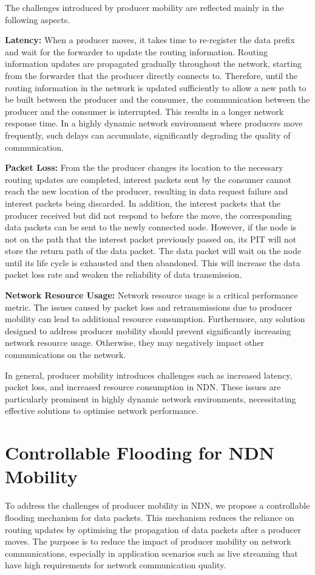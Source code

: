 \documentclass[conference]{IEEEtran}
\begin{document}
The challenges introduced by producer mobility are reflected mainly in the following aspects.

\textbf{Latency:} When a producer moves, it takes time to re-register the data prefix and wait for the forwarder to update the routing information. Routing information updates are propagated gradually throughout the network, starting from the forwarder that the producer directly connects to. Therefore, until the routing information in the network is updated sufficiently to allow a new path to be built between the producer and the consumer, the communication between the producer and the consumer is interrupted. This results in a longer network response time. In a highly dynamic network environment where producers move frequently, such delays can accumulate, significantly degrading the quality of communication.

\textbf{Packet Loss:} From the the producer changes its location to the necessary routing updates are completed, interest packets sent by the consumer cannot reach the new location of the producer, resulting in data request failure and interest packets being discarded. In addition, the interest packets that the producer received but did not respond to before the move, the corresponding data packets can be sent to the newly connected node. However, if the node is not on the path that the interest packet previously passed on, its PIT will not store the return path of the data packet. The data packet will wait on the node until its life cycle is exhausted and then abandoned. This will increase the data packet loss rate and weaken the reliability of data transmission.

\textbf{Network Resource Usage:} Network resource usage is a critical performance metric. The issues caused by packet loss and retransmissions due to producer mobility can lead to additional resource consumption. Furthermore, any solution designed to address producer mobility should prevent significantly increasing network resource usage. Otherwise, they may negatively impact other communications on the network.

In general, producer mobility introduces challenges such as increased latency, packet loss, and increased resource consumption in NDN. These issues are particularly prominent in highly dynamic network environments, necessitating effective solutions to optimise network performance.

\section{Controllable Flooding for NDN Mobility}
To address the challenges of producer mobility in NDN, we propose a controllable flooding mechanism for data packets. This mechanism reduces the reliance on routing updates by optimising the propagation of data packets after a producer moves. The purpose is to reduce the impact of producer mobility on network communications, especially in application scenarios such as live streaming that have high requirements for network communication quality.
\end{document}
